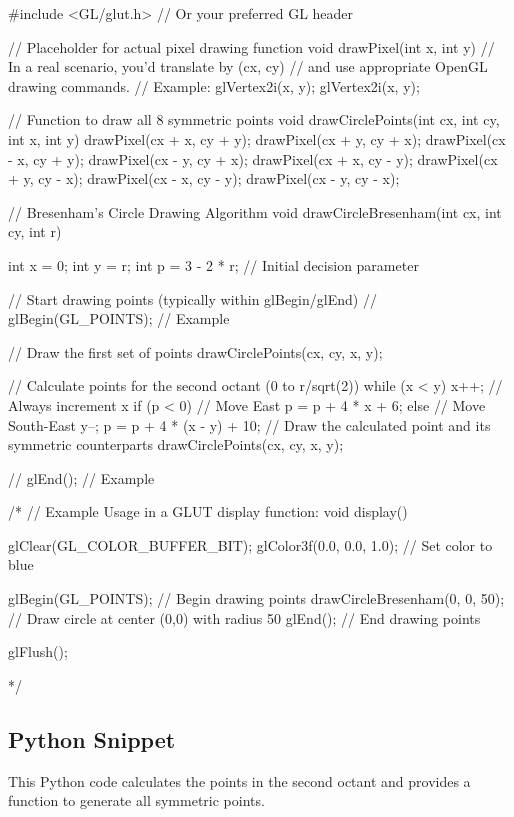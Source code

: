 \documentclass[12pt, a4paper]{article}
\begin{document}
\begin{cppcode}
#include <GL/glut.h> // Or your preferred GL header

// Placeholder for actual pixel drawing function
void drawPixel(int x, int y) {
    // In a real scenario, you'd translate by (cx, cy)
    // and use appropriate OpenGL drawing commands.
    // Example: glVertex2i(x, y);
    glVertex2i(x, y);
}

// Function to draw all 8 symmetric points
void drawCirclePoints(int cx, int cy, int x, int y) {
    drawPixel(cx + x, cy + y);
    drawPixel(cx + y, cy + x);
    drawPixel(cx - x, cy + y);
    drawPixel(cx - y, cy + x);
    drawPixel(cx + x, cy - y);
    drawPixel(cx + y, cy - x);
    drawPixel(cx - x, cy - y);
    drawPixel(cx - y, cy - x);
}

// Bresenham's Circle Drawing Algorithm
void drawCircleBresenham(int cx, int cy, int r) {
    int x = 0;
    int y = r;
    int p = 3 - 2 * r; // Initial decision parameter

    // Start drawing points (typically within glBegin/glEnd)
    // glBegin(GL_POINTS); // Example

    // Draw the first set of points
    drawCirclePoints(cx, cy, x, y);

    // Calculate points for the second octant (0 to r/sqrt(2))
    while (x < y) {
        x++; // Always increment x
        if (p < 0) {
            // Move East
            p = p + 4 * x + 6;
        } else {
            // Move South-East
            y--;
            p = p + 4 * (x - y) + 10;
        }
        // Draw the calculated point and its symmetric counterparts
        drawCirclePoints(cx, cy, x, y);
    }

    // glEnd(); // Example
}

/*
// Example Usage in a GLUT display function:
void display() {
    glClear(GL_COLOR_BUFFER_BIT);
    glColor3f(0.0, 0.0, 1.0); // Set color to blue

    glBegin(GL_POINTS); // Begin drawing points
    drawCircleBresenham(0, 0, 50); // Draw circle at center (0,0) with radius 50
    glEnd(); // End drawing points

    glFlush();
}
*/
\end{cppcode}

\subsection{Python Snippet}
This Python code calculates the points in the second octant and provides a function to generate all symmetric points.
\end{document}
